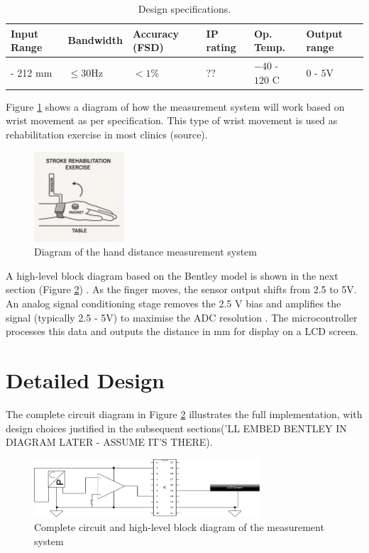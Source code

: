 \documentclass[a4paper,12pt]{article}
\begin{document}
\begin{table}[ht]
\centering
\caption{Design specifications.}
\begin{tabular}{|>{\centering\arraybackslash}p{2.2cm}|>{\centering\arraybackslash}p{2.5cm}|>{\centering\arraybackslash}p{2cm}|>{\centering\arraybackslash}p{1.5cm}|>{\centering\arraybackslash}p{2.5cm}|>{\centering\arraybackslash}p{2.5cm}|}
\hline
\textbf{Input Range} & \textbf{Bandwidth} & \textbf{Accuracy (FSD)} & \textbf{IP rating} & \textbf{Op. Temp.} & \textbf{Output range} \\
\hline
0 - 212 mm & $\leq 30 \text{Hz}$ & $<1\%$ & ?? & $-40$ - $120$ \textdegree{}C & $0$ - $5 \text{V}$  \\
\hline
\end{tabular}
\end{table}
\noindent
Figure \ref{fig:measure_diag} shows a diagram of how the measurement system will work based on wrist movement as per specification. This type of wrist movement is used as rehabilitation exercise in most clinics (source).
\begin{figure}[!ht]
    \centering
    \includegraphics[width=0.3\textwidth]{diagram-Measure.png}
    \caption{Diagram of the hand distance measurement system}
    \label{fig:measure_diag}
\end{figure}
A high-level block diagram based on the Bentley model is shown in the next section (Figure \ref{fig:cct_system}) . As the finger moves, the sensor output shifts from 2.5 to 5V. An analog signal conditioning stage removes the 2.5 V bias and amplifies the signal (typically 2.5 - 5V) to maximise the ADC resolution . The microcontroller processes this data and outputs the distance in mm for display on a LCD screen.


%
\section{Detailed Design}
 The complete circuit diagram in Figure \ref{fig:cct_system} illustrates the full implementation, with design choices justified in the subsequent sections('LL EMBED BENTLEY IN DIAGRAM LATER - ASSUME IT'S THERE). 
\begin{figure}[!ht]
    \centering
    \includegraphics[width=0.75\textwidth]{LabCctDiag.png}
    \caption{Complete circuit and high-level block diagram of the measurement system}
    \label{fig:cct_system}
\end{figure}
\end{document}
